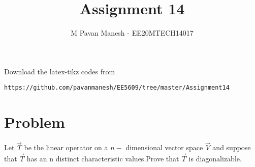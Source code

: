 \documentclass[journal,12pt]{IEEEtran}
\begin{document}
     \def\rightbox#1{\makebox[0in][r]{#1}}
     \def\centbox#1{\makebox[0in]{#1}}
     \def\topbox#1{\raisebox{-\baselineskip}[0in][0in]{#1}}
     \def\midbox#1{\raisebox{-0.5\baselineskip}[0in][0in]{#1}}
\vspace{3cm}
\title{Assignment 14}
\author{M Pavan Manesh - EE20MTECH14017}
\maketitle
\bigskip
\renewcommand{\thefigure}{\theenumi}
\renewcommand{\thetable}{\theenumi}
%
Download the latex-tikz codes from 
%
\begin{lstlisting}
https://github.com/pavanmanesh/EE5609/tree/master/Assignment14
\end{lstlisting}
\section{\textbf{Problem}}
Let $\vec{T}$ be the linear operator on a $n-$ dimensional vector space $\vec{V}$ and suppose that  $\vec{T}$ has an n distinct characteristic values.Prove that $\vec{T}$ is diagonalizable.
\end{document}
